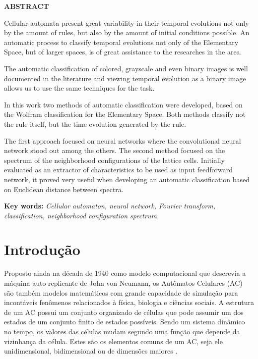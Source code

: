 \documentclass[12pt,a4paper]{report}
\begin{document}
	\newpage
	\thispagestyle{plain}
	\begin{center}
		\large
		\textbf{ABSTRACT}
	\end{center}
	\renewcommand{\baselinestretch}{0.6666666}
	Cellular automata present great variability in their temporal evolutions not only by the amount of rules, but also by the amount of initial conditions possible. An automatic process to classify temporal evolutions not only of the Elementary Space, but of larger spaces, is of great assistance to the researches in the area.
	
	The automatic classification of colored, grayscale and even binary images is well documented in the literature and viewing temporal evolution as a binary image allows us to use the same techniques for the task.
	
	In this work two methods of automatic classification were developed, based on the Wolfram classification for the Elementary Space. Both methods classify not the rule itself, but the time evolution generated by the rule.
	
	The first approach focused on neural networks where the convolutional neural network stood out among the others. The second method focused on the spectrum of the neighborhood configurations of the lattice cells. Initially evaluated as an extractor of characteristics to be used as input feedforward network, it proved very useful when developing an automatic classification based on Euclidean distance between spectra.
	\\[0.5cm]
	\begin{flushleft}
		{\bf Key words:} {\it Cellular automaton, neural network, Fourier transform, classification, neighborhood configuration spectrum.}
	\end{flushleft}
	
	\thispagestyle{empty}
	\tableofcontents
	
	\newpage
	\pagestyle{plain}
	\renewcommand{\baselinestretch}{1.5}
	\normalsize
	
	
	\chapter{Introdução}
	
	Proposto ainda na década de 1940 como modelo computacional que descrevia a máquina auto-replicante de John von Neumann, os Autômatos Celulares (AC) são também modelos matemáticos com grande capacidade de simulação para incontáveis fenômenos relacionados à física, biologia e ciências sociais. A estrutura de um AC possui um conjunto organizado de células que pode assumir um dos estados de um conjunto finito de estados possíveis. Sendo um sistema dinâmico no tempo, os valores das células mudam segundo uma função que depende da vizinhança da célula. Estes são os elementos comuns de um AC, seja ele unidimensional, bidimensional ou de dimensões maiores \cite{Sarkar:2000:BHC:349194.349202}.
	
\end{document}
